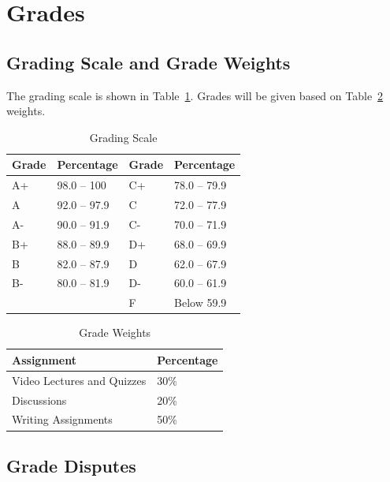 \documentclass[12pt, letterpaper]{article}
\begin{document}
\section*{Grades}

\subsection*{Grading Scale and Grade Weights}  
The grading scale is shown in Table~\ref{tab:grading-scale}. Grades will be given based on Table~\ref{tab:grade-weights} weights.

\begin{table}[ht]
\centering
\caption{Grading Scale}
\begin{tabular}{llll}
\toprule
\textbf{Grade} & \textbf{Percentage} & \textbf{Grade} & \textbf{Percentage} \\ \hline
        A+ & 98.0 -- 100  & C+ & 78.0 -- 79.9 \\
        A  & 92.0 -- 97.9 & C  & 72.0 -- 77.9 \\
        A- & 90.0 -- 91.9 & C- & 70.0 -- 71.9 \\
        B+ & 88.0 -- 89.9 & D+ & 68.0 -- 69.9 \\
        B  & 82.0 -- 87.9 & D  & 62.0 -- 67.9 \\
        B- & 80.0 -- 81.9 & D- & 60.0 -- 61.9 \\
           &              & F  & Below 59.9   \\
\bottomrule
\end{tabular}
\label{tab:grading-scale}
\end{table}

\begin{table}[ht]
    \centering
    \caption{Grade Weights}
    \begin{tabular}{ll}
        \toprule
    \textbf{Assignment} & \textbf{Percentage} \\
    \midrule
    Video Lectures and Quizzes & 30\% \\
    Discussions & 20\% \\
    Writing Assignments & 50\% \\
    \bottomrule
    \end{tabular}
    \label{tab:grade-weights}
    \end{table}

\subsection*{Grade Disputes}
\end{document}
